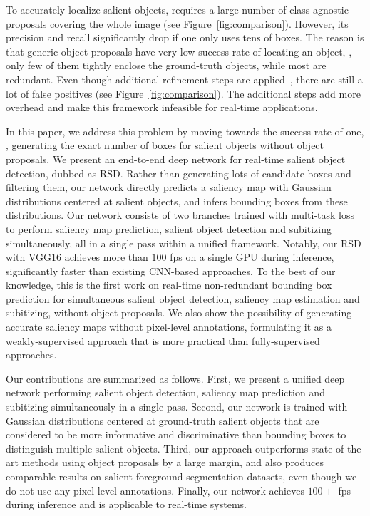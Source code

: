 \documentclass[10pt,twocolumn,letterpaper]{article}
\begin{document}
%
To accurately localize salient objects, \cite{zhang2015SOD} requires a large number of class-agnostic proposals covering the whole image (see Figure~\ref{fig:comparison}). However, its precision and recall significantly drop if one only uses tens of boxes. The reason is that generic object proposals have very low success rate of locating an object, \ie, only few of them tightly enclose the ground-truth objects, while most are redundant. Even though additional refinement steps are applied~\cite{zhang2015SOD}, there are still a lot of false positives (see Figure~\ref{fig:comparison}). The additional steps add more overhead and make this framework infeasible for real-time applications.


In this paper, we address this problem by moving towards the success rate of one, \ie, generating the exact number of boxes for salient objects without object proposals. We present an end-to-end deep network for real-time salient object detection, dubbed as RSD. Rather than generating lots of candidate boxes and filtering them, our network directly predicts a saliency map with Gaussian distributions centered at salient objects, and infers bounding boxes from these distributions. Our network consists of two branches trained with multi-task loss to perform saliency map prediction, salient object detection and subitizing simultaneously, all in a single pass within a unified framework. Notably, our RSD with VGG16 achieves more than $100$ fps on a single GPU during inference, significantly faster than existing CNN-based approaches. {To the best of our knowledge, this is the first work on real-time non-redundant bounding box prediction for simultaneous salient object detection, saliency map estimation and subitizing, without object proposals. We also show the possibility of generating accurate saliency maps without pixel-level annotations, formulating it as a weakly-supervised approach that is more practical than fully-supervised approaches.}

Our contributions are summarized as follows. First, we present a unified deep network performing salient object detection, saliency map prediction and subitizing simultaneously in a single pass.
Second, our network is trained with Gaussian distributions centered at ground-truth salient objects that are considered to be more informative and discriminative than bounding boxes to distinguish multiple salient objects. 
Third, our approach outperforms state-of-the-art methods using object proposals by a large margin, and also produces comparable results on salient foreground segmentation datasets, even though we do not use any pixel-level annotations.
Finally, our network achieves $100+$ fps during inference and is applicable to real-time systems. 
\end{document}
